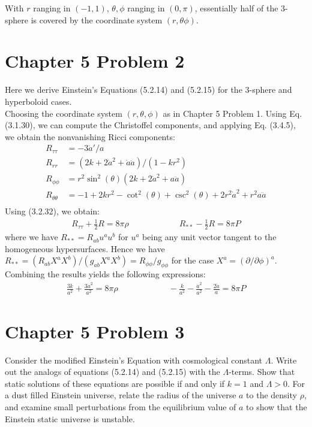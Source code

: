 \documentclass[11pt, onesided]{book}
\theoremstyle{break}
\theoremstyle{break}
\newcommand{\pd}{\partial}
\begin{document}
With $r$ ranging in $(-1,1)$, $\theta, \phi$ ranging in $(0,\pi)$, essentially half of the $3$-sphere is covered by the coordinate system $(r,\theta \phi)$. 
\newpage
\section{Chapter 5 Problem 2}
Here we derive Einstein's Equations (5.2.14) and (5.2.15) for the $3$-sphere and hyperboloid cases.\\

Choosing the coordinate system $(r,\theta,\phi)$ as in Chapter 5 Problem 1. Using Eq. (3.1.30), we can compute the Christoffel components, and applying Eq. (3.4.5), we obtain the nonvanishing Ricci components:
\begin{align*}
R_{\tau\tau} &= -{3\dot{a}'}/{a}\\
R_{rr} &= ({2k + 2\dot{a}^2 + \dot{a}\ddot{a}})/({1 - kr^2})\\
R_{\phi\phi} &= r^2 \sin^2(\theta)(2k+2\dot{a}^2 + a\ddot{a})\\
R_{\theta\theta} &= -1 + 2kr^2 - \cot^2(\theta) +\csc^2(\theta) + 2r^2 \dot{a}^2 + r^2 a\ddot{a}\\
\end{align*}
Using (3.2.32), we obtain:
\begin{align*}
R_{\tau\tau}+ \frac{1}{2}R = 8\pi \rho \qquad\qquad\qquad R_{**} - \frac{1}{2}R = 8\pi P
\end{align*}
where we have $R_{**} = R_{ab}u^au^b$ for $u^a$ being any unit vector tangent to the homogeneous hypersurfaces. Hence we have $R_{**} = (R_{ab}X^aX^b)/(g_{ab}X^aX^b) = R_{\phi\phi}/g_{\phi\phi}$ for the case $X^a = (\pd /\pd \phi)^a$. Combining the results yields the following expressions:
\begin{align*}
\frac{3k}{a^2} + \frac{3\dot{a}^2}{a^2} = 8\pi \rho \qquad\qquad\qquad
-\frac{k}{a^2} - \frac{\dot{a}^2}{a^2} - \frac{2\ddot{a}}{a} = 8\pi P
\end{align*}


\newpage
\section{Chapter 5 Problem 3}
Consider the modified Einstein's Equation with cosmological constant $\Lambda$. Write out the analogs of equations (5.2.14) and (5.2.15) with the $\Lambda$-terms. Show that static solutions of these equations are possible if and only if $k = 1$ and $\Lambda >0$. For a dust filled Einstein universe, relate the radius of the universe $a$ to the density $\rho$, and examine small perturbations from the equilibrium value of $a$ to show that the Einstein static universe is unstable.\\
\end{document}
